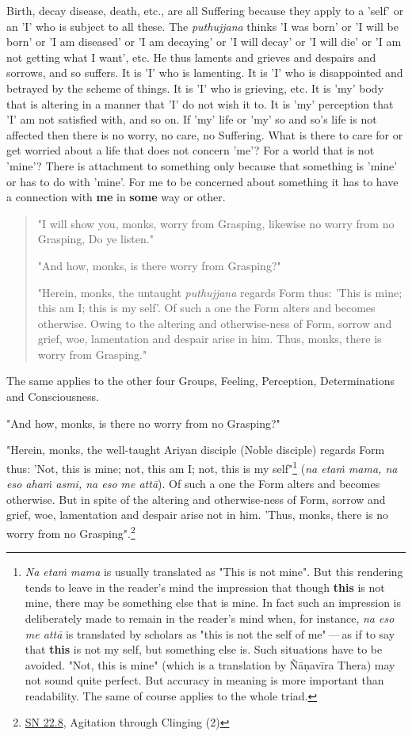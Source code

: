 Birth, decay disease, death, etc., are all Suffering because they apply
to a 'self' or an 'I' who is subject to all these. The \emph{puthujjana}
thinks 'I was born' or 'I will be born' or 'I am diseased' or 'I am
decaying' or 'I will decay' or 'I will die' or 'I am not getting what I
want', etc. He thus laments and grieves and despairs and sorrows, and so
suffers. It is 'I' who is lamenting. It is 'I' who is disappointed and
betrayed by the scheme of things. It is 'I' who is grieving, etc. It is
'my' body that is altering in a manner that 'I' do not wish it to. It is
'my' perception that 'I' am not satisfied with, and so on. If 'my' life
or 'my' so and so’s life is not affected then there is no worry, no
care, no Suffering. What is there to care for or get worried about a
life that does not concern 'me'? For a world that is not 'mine'? There
is attachment to something only because that something is 'mine' or has
to do with 'mine'. For me to be concerned about something it has to have
a connection with \textbf{me} in \textbf{some} way or other.


\begin{quotation}
"I will show you, monks, worry from Grasping, likewise no worry from no
Grasping, Do ye listen."


"And how, monks, is there worry from Grasping?"


"Herein, monks, the untaught \emph{puthujjana} regards Form thus: 'This is
mine; this am I; this is my self'. Of such a one the Form alters and
becomes otherwise. Owing to the altering and otherwise-ness of Form,
sorrow and grief, woe, lamentation and despair arise in him. Thus,
monks, there is worry from Grasping."


\end{quotation}

The same applies to the other four Groups, Feeling, Perception,
Determinations and Consciousness.


"And how, monks, is there no worry from no Grasping?"


"Herein, monks, the well-taught Ariyan disciple (Noble disciple) regards
Form thus: 'Not, this is mine; not, this am I; not, this is my
self"\footnote{\emph{Na etaṁ mama} is usually translated as "This is not mine". But this rendering tends to leave in the reader’s mind the impression that though \textbf{this} is not mine, there may be something else that is mine. In fact such an impression is deliberately made to remain in the reader’s mind when, for instance, \emph{na eso me attā} is translated by scholars as "this is not the self of me" — as if to say that \textbf{this} is not my self, but something else is. Such situations have to be avoided. "Not, this is mine" (which is a translation by Ñāṇavīra Thera) may not sound quite perfect. But accuracy in meaning is more important than readability. The same of course applies to the whole triad.} (\emph{na
etaṁ mama, na eso ahaṁ asmi, na eso me attā}). Of such a one the Form
alters and becomes otherwise. But in spite of the altering and
otherwise-ness of Form, sorrow and grief, woe, lamentation and despair
arise not in him. 'Thus, monks, there is no worry from no
Grasping".\footnote{\href{https://suttacentral.net/sn22.8/en/bodhi}{SN 22.8}, Agitation through Clinging (2)}


